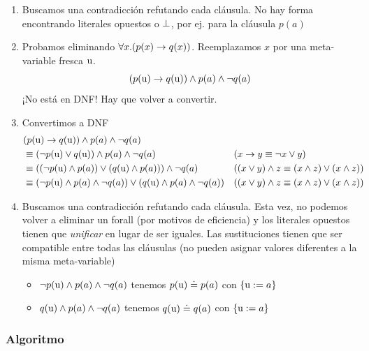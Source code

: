 \begin{ejemplo}
\begin{enumerate}
        \item Buscamos una contradicción refutando cada cláusula. No hay forma
        encontrando literales opuestos o $\bot$, por ej. para la cláusula
        $p(a)$
        \item Probamos eliminando $\forall x. (p(x) \to q(x))$. Reemplazamos
        $x$ por una meta-variable fresca $\textrm{u}$.
        \[
            (p(\textrm{u}) \to q(\textrm{u})) \wedge p(a) \wedge \neg q(a)
        \]
        ¡No está en DNF! Hay que volver a convertir.
        \item Convertimos a DNF
        \begin{align*}
            &(p(\textrm{u}) \to q(\textrm{u})) \wedge p(a) \wedge \neg q(a)\\
            &\equiv (\neg p(\textrm{u}) \vee q(\textrm{u})) \wedge p(a) \wedge \neg q(a)
            &&(x \to y \equiv \neg x \vee y)\\
            &\equiv ( (\neg p(\textrm{u}) \wedge p(a)) \vee (q(\textrm{u}) \wedge p(a))) \wedge \neg q(a)
            &&((x \vee y) \wedge z \equiv (x \wedge z) \vee (x \wedge z))\\
            &\equiv (\neg p(\textrm{u}) \wedge p(a) \wedge \neg q(a)) \vee (q(\textrm{u}) \wedge p(a)\wedge \neg q(a))
            &&((x \vee y) \wedge z \equiv (x \wedge z) \vee (x \wedge z))
        \end{align*}
        \item Buscamos una contradicción refutando cada cláusula. Esta vez, no
        podemos volver a eliminar un forall (por motivos de eficiencia) y los
        literales opuestos tienen que \textit{unificar} en lugar de ser iguales.
        Las sustituciones tienen que ser compatible entre todas las cláusulas
        (no pueden asignar valores diferentes a la misma meta-variable)
        \begin{itemize}
            \item $\neg p(\textrm{u}) \wedge p(a) \wedge \neg q(a)$ tenemos $p(\textrm{u}) \doteq p(a)$ con $\{\textrm{u} := a\}$
            \item $q(\textrm{u}) \wedge p(a) \wedge \neg q(a)$ tenemos $q(\textrm{u}) \doteq q(a)$ con $\{\textrm{u} := a\}$
        \end{itemize}
    \end{enumerate}
\end{ejemplo}

\subsubsection{Algoritmo}

